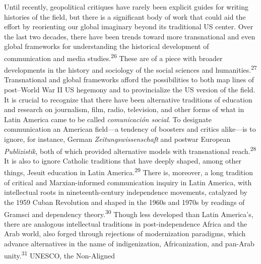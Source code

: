 \documentclass{tufte-handout}
\begin{document}
Until recently, geopolitical critiques have rarely been explicit guides
for writing histories of the field, but there is a significant body of
work that could aid the effort by reorienting our global imaginary
beyond its traditional US center. Over the last two decades, there have
been trends toward more transnational and even global frameworks for
understanding the historical development of communication and media
studies.\textsuperscript{26} These are of a piece with broader developments in
the history and sociology of the social sciences and
humanities.\textsuperscript{27} Transnational and global frameworks afford the possibilities
to both map lines of post--World War II US hegemony and to provincialize
the US version of the field. It is crucial to recognize that there have
been alternative traditions of education and research on journalism,
film, radio, television, and other forms of what in Latin America came
to be called \emph{comunicación social}. To designate communication an
American field---a tendency of boosters and critics alike---is to
ignore, for instance, German \emph{Zeitungswissenschaft} and postwar
European \emph{Publizistik}, both of which provided alternative models
with transnational reach.\textsuperscript{28} It is also to
ignore Catholic traditions that have deeply shaped, among other things,
Jesuit education in Latin America.\textsuperscript{29}
There is, moreover, a long tradition of critical and Marxian-informed
communication inquiry in Latin America, with intellectual roots in
nineteenth-century independence movements, catalyzed by the 1959 Cuban
Revolution and shaped in the 1960s and 1970s by readings of Gramsci and
dependency theory.\textsuperscript{30} Though less
developed than Latin America's, there are analogous intellectual
traditions in post-independence Africa and the Arab world, also forged
through rejections of modernization paradigms, which advance
alternatives in the name of indigenization, Africanization, and pan-Arab
unity.\textsuperscript{31} UNESCO, the Non-Aligned
\end{document}
